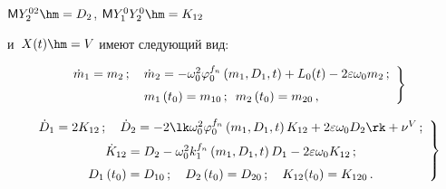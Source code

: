${\sf M}Y_2^{02} \hm= D_2$, ${\sf M}Y_1^0Y_2^0\hm = K_{12}$ 

и~$X(t)\hm= V$ имеют следующий вид:

     \begin{equation}

     \left.

     \begin{array}{c}

    \dot m_1 = m_2 \,; \quad 

    \dot m_2 = - \omega_0^2 \varphi_0^{f_n} \left(m_1, D_1,t\right) + 

    L_0 (t)- 2\varepsilon \omega_0 m_2\,;\\[6pt] 

    m_1 \left(t_0\right) = m_{10}\,;\enskip 

    m_2 \left(t_0\right) = m_{20}\,,

    \end{array}

    \right\}

    \label{e7.2-sin}

    \end{equation}

    \begin{equation}

    \left.

    \begin{array}{c}

    \dot D_1 = 2 K_{12}\,; \quad 

    \dot D_2 =-2 \lk \omega_0^2 \varphi_0^{f_n} \left(m_1, D_1,t\right) K_{12} + 

    2\varepsilon \omega_0 D_2\rk +\nu^V\,;\\[6pt]

    \dot K_{12} = D_2 - \omega_0^2 k_1^{f_n} \left(m_1, D_1,t\right) D_1 - 

    2 \varepsilon\omega_0 K_{12}\,;\\[6pt]

    D_1 \left(t_0\right) = D_{10}\,; \quad 

    D_2 \left(t_0\right) = D_{20}\,;\quad 

    K_{12} (t_0) = K_{120}\,.

    \end{array}

    \right\}

        \label{e7.3-sin}

    \end{equation}


